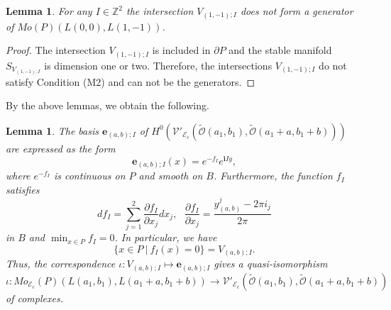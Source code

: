 \documentclass[12pt,reqno]{amsart}
\newcommand{\Z}{{\mathbb{Z}}}
\newcommand{\ii}{{\mathbf{i}}}
\newcommand{\ee}{{\mathbf{e}}}
\newcommand{\cO}{{\mathcal{O}}}
\newcommand{\cE}{{\mathcal{E}}}
\newcommand{\cV}{{\mathcal{V}}}
\newcommand{\del}{{\partial}}
\newtheorem{lem}[thm]{Lemma}%
\theoremstyle{definition}
\begin{document}
\begin{lem}
For any $I\in\Z^2$ the intersection $V_{(1,-1);I}$ does not form a generator of $Mo(P)(L(0,0),L(1,-1))$.
\end{lem}
\begin{proof}
The intersection $V_{(1,-1);I}$ is included in $\del P$ and the stable manifold $S_{V_{(1,-1);I}}$ is dimension one or two. Therefore, the intersections $V_{(1,-1);I}$ do not satisfy Condition (M2) and can not be the generators.
\end{proof}

By the above lemmas, we obtain the following.

\begin{lem}
The basis $\ee_{(a,b);I}$ of $H^0(\cV'_{\cE_c}(\widetilde{\cO}(a_1,b_1),\widetilde{\cO}(a_1+a,b_1+b)))$ are expressed as the form
\begin{equation*}
\ee_{(a,b);I}(x)=e^{-f_I}e^{\ii Iy},
\end{equation*}
where $e^{-f_I}$ is continuous on $P$ and smooth on $B$. Furthermore, the function $f_I$ satisfies
\begin{equation}\label{dfI}
df_I = \sum_{j=1}^2\frac{\del f_I}{\del x_j}dx_j,\ \ \ \frac{\del f_I}{\del x_j} = \frac{y^j_{(a,b)} - 2\pi i_j}{2\pi}
\end{equation}
in $B$ and $\min_{x\in P}f_I=0$. In particular, we have 
\begin{equation}\label{VI2}
\{x\in P\ |\ f_I(x)=0\}=V_{(a,b);I}.
\end{equation}
Thus, the correspondence $\iota:V_{(a,b);I}\mapsto \ee_{(a,b);I}$ gives a quasi-isomorphism
\begin{equation*}
\iota : Mo_{\cE_c}(P)(L(a_1,b_1),L(a_1+a,b_1+b))\to \cV'_{\cE_c}(\widetilde{\cO}(a_1,b_1),\widetilde{\cO}(a_1+a,b_1+b))
\end{equation*}
of complexes.
\end{lem}
\end{document}
